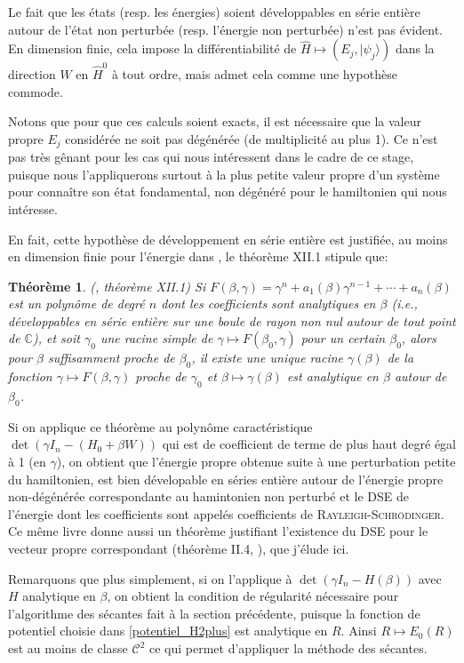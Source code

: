 \documentclass[svgnames,dvipsnames,a4paper,10pt,french]{report}
\newtheorem{theorem}{Théorème}[section]
\begin{document}
Le fait que les états (resp. les  énergies) soient développables en série entière autour de l'état non perturbée (resp. l'énergie non perturbée) n'est pas évident. En dimension finie, cela impose la différentiabilité de $\hat{H} \mapsto (E_j,|\psi_j \rangle)$ dans la direction $\hat{W}$ en $\hat{H}^0$ à tout ordre, mais \cite{cohen-tannoudji_mecanique_2021-1} admet cela comme une hypothèse commode. 

Notons que pour que ces calculs soient exacts, il est nécessaire que la valeur propre $E_j$ considérée ne soit pas dégénérée (de multiplicité au plus 1). Ce n'est pas très gênant pour les cas qui nous intéressent dans le cadre de ce stage, puisque nous l'appliquerons surtout à la plus petite valeur propre d'un système pour connaître son état fondamental, non dégénéré pour le hamiltonien qui nous intéresse.


En fait, cette hypothèse de développement en série entière est justifiée, au moins en dimension finie pour l'énergie dans \cite{reed_methods_1980}, le théorème XII.1 stipule que:
\begin{theorem}{(\cite{reed_methods_1980},  théorème XII.1)}
    Si $F(\beta,\gamma) = \gamma^n + a_1(\beta)\gamma^{n-1}+\cdots + a_n(\beta)$ est un polynôme de degré $n$ dont les coefficients sont analytiques en $\beta$ (i.e., développables en série entière sur une boule de rayon non nul autour de tout point de  $\mathbb{C}$), et soit $\gamma_0$ une racine simple de $\gamma \mapsto F(\beta_0,\gamma)$ pour un certain $\beta_0$, alors pour $\beta$ suffisamment proche de $\beta_0$, il existe une unique racine $\gamma(\beta)$ de la fonction $\gamma \mapsto F(\beta,\gamma)$ proche de $\gamma_0$ et $\beta \mapsto \gamma(\beta)$ est analytique en $\beta$ autour de $\beta_0$.
\end{theorem}


Si on applique ce théorème au polynôme caractéristique $\det (\gamma I_n -( H_0 + \beta W))$ qui est de coefficient de terme de plus haut degré égal à 1 (en $\gamma$), on obtient que l'énergie propre obtenue suite à une perturbation \og petite \fg{} du hamiltonien, est bien dévelopable en séries entière autour de l'énergie propre non-dégénérée correspondante au hamintonien non perturbé et le DSE de l'énergie dont les coefficients sont appelés coefficients  de \textsc{Rayleigh-Schrödinger}. Ce même livre donne aussi un théorème justifiant l'existence du DSE pour le vecteur propre correspondant (théorème II.4, \cite{reed_methods_1980}), que j'élude ici.

Remarquons que plus simplement, si on l'applique à $\det (\gamma I_n -H(\beta))$ avec $H$ analytique en $\beta$, on obtient la condition de régularité nécessaire pour l'algorithme des sécantes fait à la section précédente, puisque la fonction de potentiel choisie dans \ref{potentiel_H2plus} est analytique en $R$. Ainsi $R \mapsto E_0(R)$ est au moins de classe $\mathscr{C}^2$ ce qui permet d'appliquer la méthode des sécantes.
\end{document}
